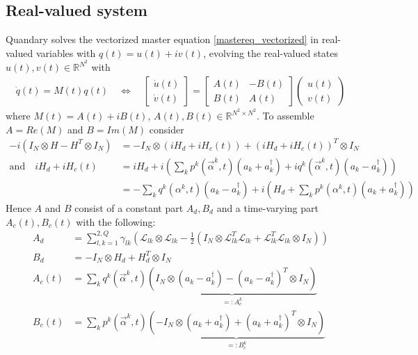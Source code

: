 \documentclass[letterpaper]{article}
\newcommand{\Ell}{\mathcal{L}}
\newcommand{\R}{\mathds{R}}
\begin{document}
  \subsection{Real-valued system}
   Quandary solves the vectorized master equation \eqref{mastereq_vectorized} in
   real-valued variables with $q(t) = u(t) + iv(t)$, evolving the real-valued
   states $u(t), v(t)\in \R^{N^2}$ with
   \begin{align}
     \dot q(t) = M(t) q(t) \quad \Leftrightarrow \quad \begin{bmatrix} \dot u(t) \\ \dot v(t) \end{bmatrix} = 
   \begin{bmatrix} A(t) & -B(t) \\ B(t) & A(t) \end{bmatrix} 
   \begin{pmatrix} u(t) \\ v(t) \end{pmatrix} 
   \label{realvaluedODE}
   \end{align}
   where $M(t) = A(t) + i B(t)$, $A(t), B(t)\in \R^{N^2\times N^2}$. To assemble
   $A = Re(M)$ and $B = Im(M)$ consider
   \begin{align}
     -i(I_N \otimes H - H^T \otimes I_N) &= -I_N \otimes \left(iH_d +
     iH_c(t)\right) + \left(iH_d + iH_c(t)\right)^T \otimes I_N \\
     \text{and} \quad iH_d + iH_c(t) &= i H_d + i\left( \sum_k
     p^k(\vec{\alpha}^k,t)(a_k + a_k^{\dagger}) + iq^k(\vec{\alpha}^k,t)(a_k -
     a_k^{\dagger})\right) \\
                    &= - \sum_k q^k(\alpha^k,t)(a_k - a_k^{\dagger}) + i\left(
                    H_d + \sum_k p^k(\alpha^k,t)(a_k+a_k^{\dagger}) \right) 
   \end{align}
   Hence $A$ and $B$ consist of a constant part $A_d, B_d$ and a time-varying
   part $A_c(t), B_c(t)$ with the following:
   \begin{align}
     A_d &=  \sum_{l,k=1}^{2,Q}\gamma_{lk} \left( \Ell_{lk}\otimes\Ell_{lk} -
     \frac 1 2 \left(I_N \otimes \Ell_{lk}^T\Ell_{lk} +
     \Ell_{lk}^T\Ell_{lk}\otimes I_N\right) \right)\\
     B_d &= -I_N \otimes H_d + H_d^T \otimes I_N \\
     A_c(t) &= \sum_k q^k(\vec{\alpha}^k,t) \underbrace{\left( I_N \otimes
     \left(a_k - a_k^{\dagger}\right) - \left(a_k -
     a_k^{\dagger}\right)^T\otimes I_N \right)}_{=:A_c^k} \\
     B_c(t) &= \sum_k p^k(\vec{\alpha}^k,t) \underbrace{\left( - I_N \otimes
     \left(a_k + a_k^{\dagger}\right) + \left(a_k +
     a_k^{\dagger}\right)^T\otimes I_N \right)}_{=:B_c^k} 
   \end{align}
\end{document}
